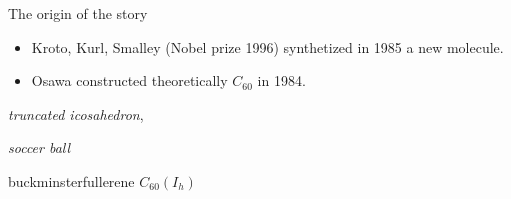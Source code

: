 \documentclass[%
pdf,
colorBG,
slideColor,
]{prosper}
\begin{document}
\begin{slide}{The origin of the story}
\begin{itemize}
\item Kroto, Kurl, Smalley (Nobel prize 1996) synthetized in 1985 a new molecule.
\item Osawa constructed theoretically $C_{60}$ in 1984.
\end{itemize}
\begin{center}
\begin{minipage}[b]{5.5cm}
\centering
{}\par
{\em truncated icosahedron}, \par
{\em soccer ball}
\end{minipage}
\hspace{0.1cm}
\begin{minipage}[b]{5.5cm}
\centering
{}\par
buckminsterfullerene $C_{60}(I_h)$
\end{minipage}
\end{center}


\end{slide}




\end{document}
